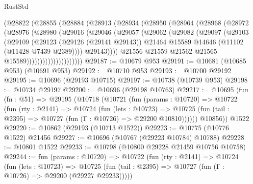 \begin{lexlean}{RustStd}
\begin{coremodule}
                  (@28822
                    (@28855
                      (@28884
                        (@28913
                          (@28934
                            (@28950
                              (@28964
                                (@28968
                                  (@28972
                                    (@28976
                                      (@28980
                                        (@29016
                                          (@29046
                                            (@29057
                                              (@29062
                                                (@29082
                                                  (@29097
                                                    (@29103
                                                      (@29109
                                                        (@29123
                                                          (@29126 (@29141 @29143))
                                                          @21464
                                                          @15589
                                                          @14646
                                                          (@11102 (@11428 @7439 @2389))))
                                                      @29143))))
                                              @21556
                                              @21559
                                              @21562
                                              @21565
                                              @15589)))))))))))))))))))))
@29187 := @10679 @953
@29191 := @10681 (@10685 @953) (@10691 @953)
@29192 := @10710 @953
@29193 := @10700 @29192
@29195 := @10696 (@29193 @10715)
@29197 := @10738 (@10739 @953)
@29198 := @10734 @29197
@29200 := @10696 (@29198 @10763)
@29217 := @10695
    (fun (fn : @51) =>
    @29195
      (@10718
        (@10721
          (fun (params : @10720) =>
          @10722
            (fun (rty : @2141) =>
            @10724
              (fun (lets : @10723) =>
              @10725 (fun (tail : @2395) => @10727 (fun (Γ : @10726) => @29200 @10810))))))
        @10856))
    @1522
@29220 := @10862 (@29193 (@10713 @1522))
@29223 := @10775 (@10776 @1522) @21456
@29227 := @10696 (@10767 (@29223 @10784) @10788)
@29228 := @10801 @1522
@29233 := @10798 (@10800 @29228 @21459 @10756 @10758)
@29244 := fun (params : @10720) =>
  @10722
    (fun (rty : @2141) =>
    @10724
      (fun (lets : @10723) =>
      @10725 (fun (tail : @2395) => @10727 (fun (Γ : @10726) => @29200 (@29227 @29233)))))

\end{coremodule}
\end{lexlean}
